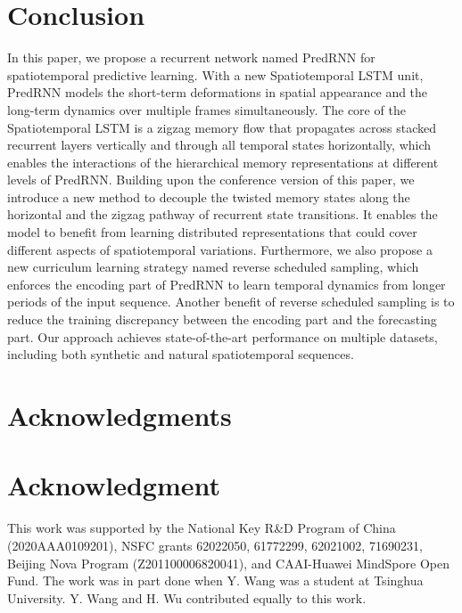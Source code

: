 \documentclass[10pt,journal,compsoc]{IEEEtran}
\begin{document}
\section{Conclusion}


In this paper, we propose a recurrent network named PredRNN for spatiotemporal predictive learning. 
With a new Spatiotemporal LSTM unit, PredRNN models the short-term deformations in spatial appearance and the long-term dynamics over multiple frames simultaneously.
The core of the Spatiotemporal LSTM is a zigzag memory flow that propagates across stacked recurrent layers vertically and through all temporal states horizontally, which enables the interactions of the hierarchical memory representations at different levels of PredRNN. 
Building upon the conference version of this paper, we introduce a new method to decouple the twisted memory states along the horizontal and the zigzag pathway of recurrent state transitions. It enables the model to benefit from learning distributed representations that could cover different aspects of spatiotemporal variations.
Furthermore, we also propose a new curriculum learning strategy named reverse scheduled sampling, which enforces the encoding part of PredRNN to learn temporal dynamics from longer periods of the input sequence. 
Another benefit of reverse scheduled sampling is to reduce the training discrepancy between the encoding part and the forecasting part. 
Our approach achieves state-of-the-art performance on multiple datasets, including both synthetic and natural spatiotemporal sequences.














\ifCLASSOPTIONcompsoc
\section*{Acknowledgments}
\else
\section*{Acknowledgment}
\fi

This work was supported by the National Key R\&D Program of China (2020AAA0109201), NSFC grants 62022050, 61772299, 62021002, 71690231, Beijing Nova Program (Z201100006820041), and CAAI-Huawei MindSpore Open Fund. The work was in part done when Y. Wang was a student at Tsinghua University. Y. Wang and H. Wu contributed equally to this work.




\ifCLASSOPTIONcaptionsoff
  \newpage
\fi











\end{document}
